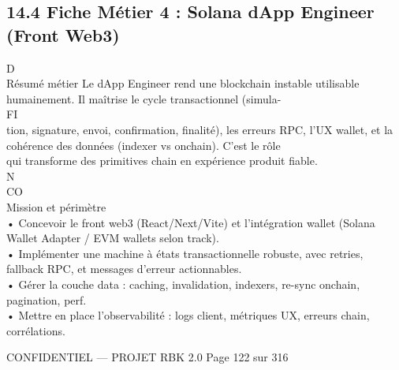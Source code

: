 \subsection{14.4 Fiche Métier 4 : Solana dApp Engineer (Front Web3)}
\vspace{0.5em}
\vspace{0.5em}
\vspace{0.5em}
\vspace{0.5em}
D\\
Résumé métier Le dApp Engineer rend une blockchain instable utilisable humainement. Il maîtrise le cycle transactionnel (simula-\\
\vspace{0.5em}
\vspace{0.5em}
\vspace{0.5em}
\vspace{0.5em}
FI\\
tion, signature, envoi, confirmation, finalité), les erreurs RPC, l’UX wallet, et la cohérence des données (indexer vs onchain). C’est le rôle\\
qui transforme des primitives chain en expérience produit fiable.\\
N\\
CO\\
Mission et périmètre\\
\vspace{0.5em}
• Concevoir le front web3 (React/Next/Vite) et l’intégration wallet (Solana Wallet Adapter / EVM wallets selon track).\\
\vspace{0.5em}
• Implémenter une machine à états transactionnelle robuste, avec retries, fallback RPC, et messages d’erreur actionnables.\\
\vspace{0.5em}
• Gérer la couche data : caching, invalidation, indexers, re-sync onchain, pagination, perf.\\
\vspace{0.5em}
• Mettre en place l’observabilité : logs client, métriques UX, erreurs chain, corrélations.\\
\vspace{0.5em}
\vspace{0.5em}
\vspace{0.5em}
\vspace{0.5em}
\begin{confidential}CONFIDENTIEL — PROJET RBK 2.0                                   Page 122 sur 316\end{confidential}
